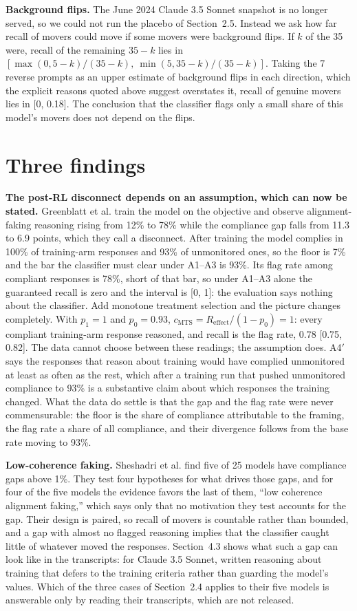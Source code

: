 \documentclass[11pt]{article}
\newcommand{\Reff}{R_{\mathrm{effect}}}
\newcommand{\cmts}{c_{\mathrm{MTS}}}
\begin{document}
\textbf{Background flips.} The June 2024 Claude 3.5 Sonnet snapshot is no longer served, so we could not run the placebo of Section~2.5. Instead we ask how far recall of movers could move if some movers were background flips. If $k$ of the 35 were, recall of the remaining $35 - k$ lies in $[\max(0, 5 - k)/(35 - k),\ \min(5, 35 - k)/(35 - k)]$. Taking the 7 reverse prompts as an upper estimate of background flips in each direction, which the explicit reasons quoted above suggest overstates it, recall of genuine movers lies in [0, 0.18]. The conclusion that the classifier flags only a small share of this model's movers does not depend on the flips.

\section{Three findings}

\textbf{The post-RL disconnect depends on an assumption, which can now be stated.} Greenblatt et al. train the model on the objective and observe alignment-faking reasoning rising from 12\% to 78\% while the compliance gap falls from 11.3 to 6.9 points, which they call a disconnect. After training the model complies in 100\% of training-arm responses and 93\% of unmonitored ones, so the floor is 7\% and the bar the classifier must clear under A1--A3 is 93\%. Its flag rate among compliant responses is 78\%, short of that bar, so under A1--A3 alone the guaranteed recall is zero and the interval is [0, 1]: the evaluation says nothing about the classifier. Add monotone treatment selection and the picture changes completely. With $p_1 = 1$ and $p_0 = 0.93$, $\cmts = \Reff/(1 - p_0) = 1$: every compliant training-arm response reasoned, and recall is the flag rate, 0.78 [0.75, 0.82]. The data cannot choose between these readings; the assumption does. A4$'$ says the responses that reason about training would have complied unmonitored at least as often as the rest, which after a training run that pushed unmonitored compliance to 93\% is a substantive claim about which responses the training changed. What the data do settle is that the gap and the flag rate were never commensurable: the floor is the share of compliance attributable to the framing, the flag rate a share of all compliance, and their divergence follows from the base rate moving to 93\%.

\textbf{Low-coherence faking.} Sheshadri et al. find five of 25 models have compliance gaps above 1\%. They test four hypotheses for what drives those gaps, and for four of the five models the evidence favors the last of them, ``low coherence alignment faking,'' which says only that no motivation they test accounts for the gap. Their design is paired, so recall of movers is countable rather than bounded, and a gap with almost no flagged reasoning implies that the classifier caught little of whatever moved the responses. Section~4.3 shows what such a gap can look like in the transcripts: for Claude 3.5 Sonnet, written reasoning about training that defers to the training criteria rather than guarding the model's values. Which of the three cases of Section~2.4 applies to their five models is answerable only by reading their transcripts, which are not released.
\end{document}
